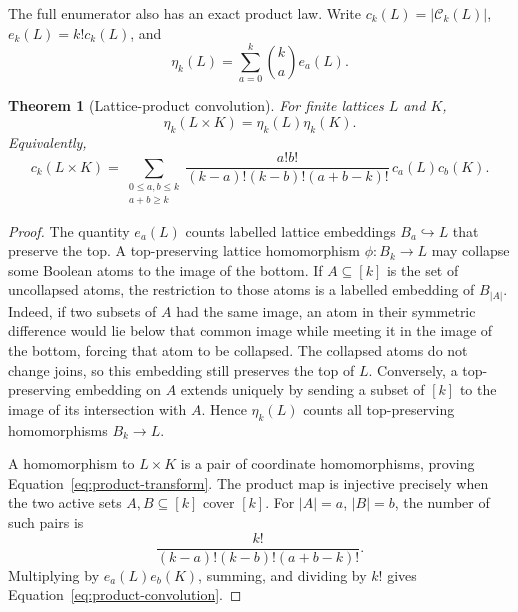 \documentclass[11pt]{article}
\newtheorem{theorem}{Theorem}[section]
\theoremstyle{definition}
\theoremstyle{remark}
\newcommand{\cC}{\mathcal C}
\begin{document}
The full enumerator also has an exact product law.  Write
$c_k(L)=|\cC_k(L)|$, $e_k(L)=k!c_k(L)$, and
\begin{equation}\label{eq:hom-transform}
 \eta_k(L)=\sum_{a=0}^k\binom ka e_a(L).
\end{equation}

\begin{theorem}[Lattice-product convolution]\label{thm:product}
For finite lattices $L$ and $K$,
\begin{equation}\label{eq:product-transform}
 \eta_k(L\times K)=\eta_k(L)\eta_k(K).
\end{equation}
Equivalently,
\begin{equation}\label{eq:product-convolution}
 \boxed{
 c_k(L\times K)=
 \sum_{\substack{0\le a,b\le k\\a+b\ge k}}
 \frac{a!b!}{(k-a)!(k-b)!(a+b-k)!}\,c_a(L)c_b(K).}
\end{equation}
\end{theorem}

\begin{proof}
The quantity $e_a(L)$ counts labelled lattice embeddings $B_a\hookrightarrow
L$ that preserve the top.  A top-preserving lattice homomorphism
$\phi:B_k\to L$ may collapse some Boolean atoms to the image of the bottom.
If $A\subseteq[k]$ is the set of uncollapsed atoms, the restriction to those
atoms is a labelled embedding of $B_{|A|}$.  Indeed, if two subsets of $A$
had the same image, an atom in their symmetric difference would lie below
that common image while meeting it in the image of the bottom, forcing that
atom to be collapsed.  The collapsed atoms do not change joins, so this
embedding still preserves the top of $L$.  Conversely, a top-preserving
embedding on $A$ extends uniquely by sending a subset of $[k]$ to the image
of its intersection with $A$.  Hence $\eta_k(L)$ counts all
top-preserving homomorphisms $B_k\to L$.

A homomorphism to $L\times K$ is a pair of coordinate homomorphisms, proving
Equation~\eqref{eq:product-transform}.
The product map is injective precisely
when the two active sets $A,B\subseteq[k]$ cover $[k]$.  For
$|A|=a$, $|B|=b$, the number of such pairs is
\[
 \frac{k!}{(k-a)!(k-b)!(a+b-k)!}.
\]
Multiplying by $e_a(L)e_b(K)$, summing, and dividing by $k!$ gives
Equation~\eqref{eq:product-convolution}.
\end{proof}
\end{document}
